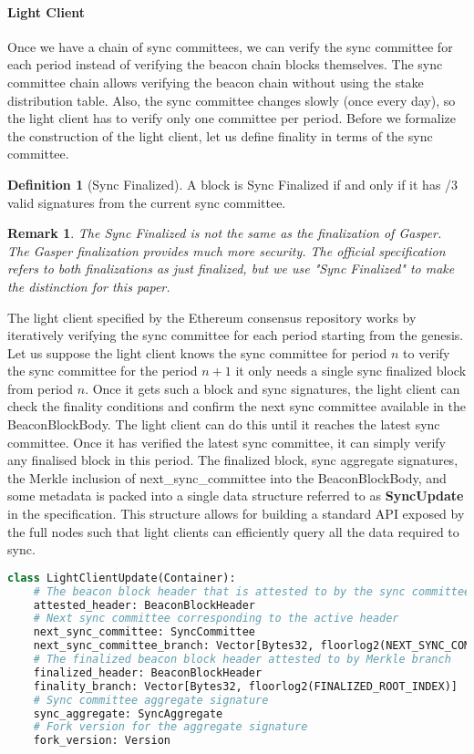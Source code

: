 \documentclass[a4paper,11pt,oneside]{article}
\newtheorem*{remark}{Remark}
\theoremstyle{definition}
\newtheorem{definition}{Definition}
\begin{document}
  \paragraph{Light Client}
  Once we have a chain of sync committees, we can verify the sync committee for each period instead of verifying the beacon chain blocks themselves. The sync committee chain allows verifying the beacon chain without using the stake distribution table. Also, the sync committee changes slowly (once every day), so the light client has to verify only one committee per period. Before we formalize the construction of the light client, let us define finality in terms of the sync committee. 
  \begin{definition}[Sync Finalized]
  A block is Sync Finalized if and only if it has /3 valid signatures from the current sync committee. 
  \end{definition}
  \begin{remark}
  The Sync Finalized is not the same as the finalization of Gasper. The Gasper finalization provides much more security. The official specification refers to both finalizations as just finalized, but we use "Sync Finalized" to make the distinction for this paper.
  \end{remark}
  The light client specified by the Ethereum consensus repository works by iteratively verifying the sync committee for each period starting from the genesis. Let us suppose the light client knows the sync committee for period $n$ to verify the sync committee for the period $n + 1$ it only needs a single sync finalized block from period $n$. Once it gets such a block and sync signatures, the light client can check the finality conditions and confirm the next sync committee available in the BeaconBlockBody. The light client can do this until it reaches the latest sync committee. Once it has verified the latest sync committee, it can simply verify any finalised block in this period. The finalized block, sync aggregate signatures, the Merkle inclusion of next\_sync\_committee into the BeaconBlockBody, and some metadata is packed into a single data structure referred to as \textbf{SyncUpdate} in the specification. This structure allows for building a standard API exposed by the full nodes such that light clients can efficiently query all the data required to sync.      
  \begin{lstlisting}[language=Python,caption={The above code is from the light client specification \cite{EthereumConcensusSpecs}},captionpos=b]
  class LightClientUpdate(Container):
    # The beacon block header that is attested to by the sync committee
    attested_header: BeaconBlockHeader
    # Next sync committee corresponding to the active header
    next_sync_committee: SyncCommittee
    next_sync_committee_branch: Vector[Bytes32, floorlog2(NEXT_SYNC_COMMITTEE_INDEX)]
    # The finalized beacon block header attested to by Merkle branch
    finalized_header: BeaconBlockHeader
    finality_branch: Vector[Bytes32, floorlog2(FINALIZED_ROOT_INDEX)]
    # Sync committee aggregate signature
    sync_aggregate: SyncAggregate
    # Fork version for the aggregate signature
    fork_version: Version
  \end{lstlisting}
  
\end{document}
